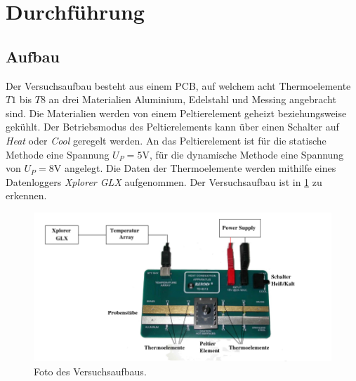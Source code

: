 \section{Durchführung}
\label{sec:durchführung}

\subsection{Aufbau}
\label{sec:aufbau}
Der Versuchsaufbau besteht aus einem PCB, auf welchem acht Thermoelemente $T1$ bis
$T8$ an drei Materialien Aluminium, Edelstahl und Messing angebracht sind. Die
Materialien werden von einem Peltierelement geheizt beziehungsweise gekühlt.
Der Betriebsmodus des Peltierelements kann über einen Schalter auf \textit{Heat}
oder \textit{Cool} geregelt werden. An das Peltierelement ist für die statische
Methode eine Spannung $U_P = 5 \si{\volt}$, für die dynamische Methode eine
Spannung von $U_P = 8 \si{\volt}$ angelegt. Die Daten der Thermoelemente werden
mithilfe eines Datenloggers \textit{Xplorer GLX} aufgenommen.
Der Versuchsaufbau ist in \ref{fig:aufbau} zu erkennen.

\begin{figure}[H]
  \centering
  \includegraphics[scale=0.5]{pcb.png}
  \caption{Foto des Versuchsaufbaus.}
  \label{fig:aufbau}
\end{figure}
